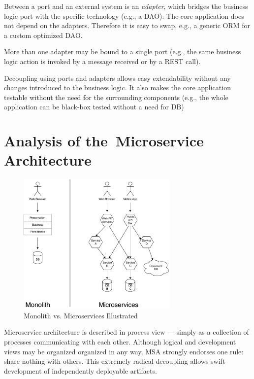 \documentclass[thesis=M,english,hidelinks]{FITthesis}[2012/10/20]
\begin{document}
Between a port and an external system is an \textit{adapter}, which bridges the business logic port with the specific technology (e.g., a \acrlong{DAO}). The core application does not depend on the adapters. Therefore it is easy to swap, e.g., a generic \acrshort{ORM} for a custom optimized \acrshort{DAO}.

More than one adapter may be bound to a single port (e.g., the same business logic action is invoked by a message received or by a \acrshort{REST} call).

Decoupling using ports and adapters allows easy extendability without any changes introduced to the business logic. It also makes the core application testable without the need for the surrounding components (e.g., the whole application can be black-box tested without a need for \acrshort{DB})

% 
% 

% 
% 

\chapter{Analysis of the~Microservice Architecture}
\label{sec:msa_analysis}

\begin{figure}[b]
  \centering
    \includegraphics[width=0.7\textwidth]{images/monolith_vs_microservice.pdf}
    \caption{Monolith vs. Microservices Illustrated}
    \label{fig:monolith_vs_microservices}
\end{figure}

Microservice architecture is described in process view --- simply as a collection of processes communicating with each other. Although logical and development views may be organized organized in any way, \acrshort{MSA} strongly endorses one rule: share nothing with others. This extremely radical decoupling allows swift development of independently deployable artifacts.
\end{document}
